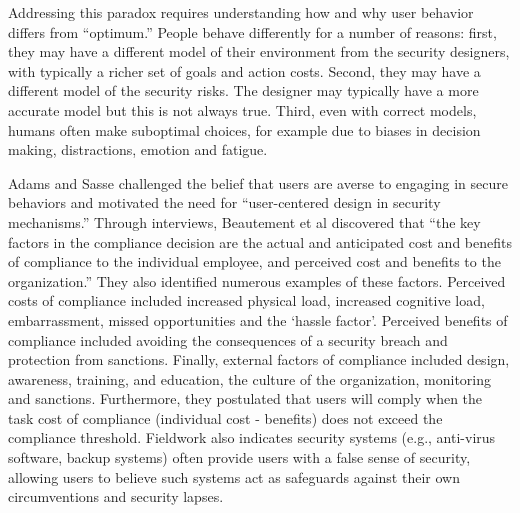 \documentclass{acm_proc_article-sp}
\begin{document}
Addressing this paradox requires understanding how and why user behavior
differs from ``optimum.''
People behave differently for a number of reasons:
first, they may have a
different model of their environment from the security designers, with
typically a richer set of goals and action costs.
Second, they may have a
different model of the security risks. The designer may typically have
a more accurate model but this is not always true.
Third, even with
correct models, humans often make suboptimal choices, for example due
to biases in decision making, distractions, emotion and fatigue.


Adams and Sasse 
\cite{adams1999users} challenged the belief that users 
are averse to engaging in secure behaviors and motivated the need for 
``user-centered design in security mechanisms.'' 
Through interviews, Beautement et al  \cite{beautement2009compliance} discovered that ``the key factors in 
the compliance decision are the actual and anticipated cost and benefits of 
compliance to the individual employee, and perceived cost and benefits to 
the organization.'' They also identified numerous examples of these
factors.
Perceived costs of compliance included increased physical load,
increased cognitive load, embarrassment, missed opportunities and the `hassle factor'.
Perceived benefits of compliance included avoiding the consequences of
a security breach and protection from sanctions.
Finally, external factors of compliance included design, awareness,
training, and education, the culture of the organization, monitoring and sanctions.
Furthermore, they postulated that users will comply when the task cost of 
compliance (individual cost - benefits) does not exceed the compliance threshold. 
Fieldwork also indicates security systems (e.g., anti-virus software, backup systems) 
often provide users with a false sense of security, allowing users to believe such 
systems act as safeguards against their own circumventions and security lapses.
\end{document}
